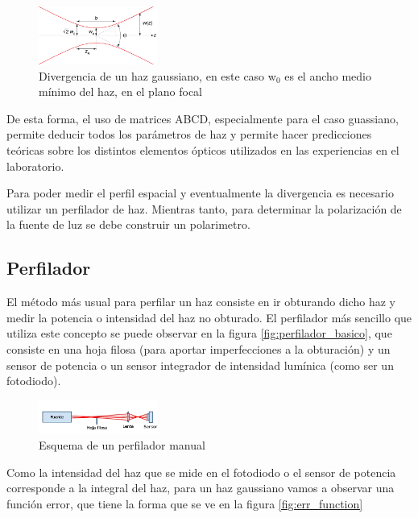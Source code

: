 \begin{figure}[H]
\centering
\includegraphics[width=0.35\textwidth]{fig/gaussian_beam_divergence}
\caption{Divergencia de un haz gaussiano, en este caso w$_0$ es el ancho medio mínimo del haz, en el plano focal}
\label{fig:gaussian_beam_divergence}
\end{figure}

De esta forma, el uso de matrices ABCD, especialmente para el caso guassiano, permite deducir todos los parámetros de haz y permite hacer predicciones teóricas sobre los distintos elementos ópticos utilizados en las experiencias en el laboratorio.

Para poder medir el perfil espacial y eventualmente la divergencia es necesario utilizar un perfilador de haz. Mientras tanto, para determinar la polarización de la fuente de luz se debe construir un polarimetro.

\subsection{Perfilador}

El método más usual para perfilar un haz consiste en ir obturando dicho haz y medir la potencia o intensidad del haz no obturado. El perfilador más sencillo que utiliza este concepto se puede observar en la figura \ref{fig:perfilador_basico}, que consiste en una hoja filosa (para aportar imperfecciones a la obturación) y un sensor de potencia o un sensor integrador de intensidad lumínica (como ser un fotodiodo). 

\begin{figure}[H]
\centering
\includegraphics[width=0.35\textwidth]{fig/perfilador/esquema_basico}
\caption{Esquema de un perfilador manual}
\label{fig:perfilador/esquema_basico}
\end{figure}

Como la intensidad del haz que se mide en el fotodiodo o el sensor de potencia corresponde a la integral del haz, para un haz gaussiano vamos a observar una función error, que tiene la forma que se ve en la figura \ref{fig:err_function}

